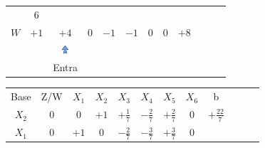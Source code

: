 \documentclass{beamer}
\begin{document}
\begin{frame}
{\begin{table}
\begin{tabular}{c c c c c c c c c c c c}
				& \cellcolor{gray!50} $\scriptstyle 6$  \\
				\cellcolor{blue!100} \color{white} $\scriptstyle W$
				& \cellcolor{yellow!90} $\scriptstyle +1$
				& \cellcolor{gray!50} $\scriptstyle +4$
				& \cellcolor{yellow!90} $\scriptstyle 0$
				& \cellcolor{yellow!90} $\scriptstyle -1$
				& \cellcolor{yellow!90} $\scriptstyle -1$
				& \cellcolor{yellow!90} $\scriptstyle 0$
				& \cellcolor{yellow!90} $\scriptstyle 0$ 
				& \cellcolor{gray!50} $\scriptstyle +8$  \\
				& & \includegraphics[width=0.3cm,height=0.3cm]{setacima.jpg} \\
				& & \scriptsize Entra \\
			\end{tabular}
		\end{table}			
	}
	{
		\begin{table}		
			\begin{tabular}{c c c c c c c c c c c c}
				\cline{1-8} 
				\cellcolor{blue!100} \color{white} \scriptsize Base 
				&\cellcolor{blue!100} \color{white} \scriptsize Z/W
				&\cellcolor{blue!100} \color{red} $\scriptstyle X_1$ 
				&\cellcolor{blue!100} \color{red} $\scriptstyle X_2$ 
				&\cellcolor{blue!100} \color{white}   $\scriptstyle X_3$ 
				&\cellcolor{blue!100} \color{white} $\scriptstyle X_4$ 
				&\cellcolor{blue!100} \color{white}   $\scriptstyle X_5$ 
				&\cellcolor{blue!100} \color{red}   $\scriptstyle X_6$ 
				&\cellcolor{blue!100} \color{white} \scriptsize b
				&
				&
				& \\
				\cellcolor{blue!100} \color{red} $\scriptstyle X_2$
				& \cellcolor{yellow!50} $\scriptstyle 0$
				& \cellcolor{yellow!50} $\scriptstyle 0$
				& \cellcolor{yellow!50} $\scriptstyle +1$
				& \cellcolor{yellow!50} $\scriptstyle +\frac{1}{7}$
				& \cellcolor{yellow!50} $\scriptstyle -\frac{2}{7}$
				& \cellcolor{yellow!50} $\scriptstyle +\frac{2}{7}$
				& \cellcolor{yellow!50} $\scriptstyle 0$
				& \cellcolor{yellow!50} $\scriptstyle +\frac{22}{7}$ \\
			    \cellcolor{blue!100} \color{red} $\scriptstyle X_1$
				& \cellcolor{yellow!50} $\scriptstyle 0$
				& \cellcolor{yellow!50} $\scriptstyle +1$
				& \cellcolor{yellow!50} $\scriptstyle 0$
				& \cellcolor{yellow!50} $\scriptstyle -\frac{2}{7}$			
				& \cellcolor{yellow!50} $\scriptstyle -\frac{3}{7}$
				& \cellcolor{yellow!50} $\scriptstyle +\frac{3}{7}$
				& \cellcolor{yellow!50} $\scriptstyle 0$ 

\end{tabular}
\end{table}}
\end{frame}
\end{document}
